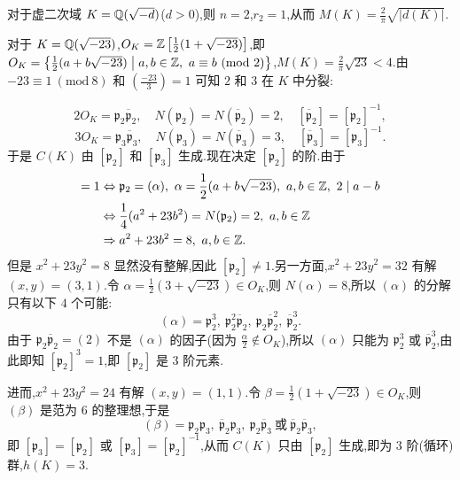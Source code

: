 \begin{example}\label{ex:ch3-s1-3-2}
对于虚二次域 $K=\mathbb{Q}(\sqrt{-d})$($d>0$),则 $n=2$,$r_2=1$,从而 $M(K)=\frac{2}{\pi}\sqrt{|d(K)|}$.

\begin{sloppypar}
对于 $K=\mathbb{Q}(\sqrt{-23})$,$O_K=\mathbb{Z}\left[\frac{1}{2}(1+\sqrt{-23})\right]$,即 $O_K=\left\{\frac{1}{2}(a+b\sqrt{-23})\;\middle|\;a,b\in\Z,\ a\equiv b\ (\mathrm{mod}\ 2)\right\}$,$M(K)=\frac{2}{\pi}\sqrt{23}<4$.由 $-23\equiv 1\ (\mathrm{mod}\ 8)$ 和 $\left(\frac{-23}{3}\right)=1$ 可知 $2$ 和 $3$ 在 $K$ 中分裂:
\end{sloppypar}
\[
  2O_K=\mathfrak{p}_2\overline{\mathfrak{p}}_2,\quad N(\mathfrak{p}_2)=N(\overline{\mathfrak{p}}_2)=2,\quad [\overline{\mathfrak{p}}_2]=[\mathfrak{p}_2]^{-1},
\]
\[
  3O_K=\mathfrak{p}_3\overline{\mathfrak{p}}_3,\quad N(\mathfrak{p}_3)=N(\overline{\mathfrak{p}}_3)=3,\quad [\overline{\mathfrak{p}}_3]=[\mathfrak{p}_3]^{-1}.
\]
于是 $C(K)$ 由 $[\mathfrak{p}_2]$ 和 $[\mathfrak{p}_3]$ 生成.现在决定 $[\mathfrak{p}_2]$ 的阶.由于
\begin{align*}
  [\mathfrak{p}_2]=1&\Leftrightarrow\mathfrak{p}_2=(\alpha),\ \alpha=\frac{1}{2}(a+b\sqrt{-23}),\ a,b\in\Z,\ 2\mid a-b\\
  &\Leftrightarrow\frac{1}{4}(a^2+23b^2)=N(\mathfrak{p}_2)=2,\ a,b\in\Z\\
  &\Rightarrow a^2+23b^2=8,\ a,b\in\Z.
\end{align*}
但是 $x^2+23y^2=8$ 显然没有整解,因此 $[\mathfrak{p}_2]\neq 1$.另一方面,$x^2+23y^2=32$ 有解 $(x,y)=(3,1)$.令 $\alpha=\frac{1}{2}(3+\sqrt{-23})\in O_K$,则 $N(\alpha)=8$,所以 $(\alpha)$ 的分解只有以下 $4$ 个可能:
\[
  (\alpha)=\mathfrak{p}_2^3,\ \mathfrak{p}_2^2\overline{\mathfrak{p}}_2,\ \mathfrak{p}_2\overline{\mathfrak{p}}_2^2,\ \overline{\mathfrak{p}}_2^3.
\]
由于 $\mathfrak{p}_2\overline{\mathfrak{p}}_2=(2)$ 不是 $(\alpha)$ 的因子(因为 $\frac{\alpha}{2}\notin O_K$),所以 $(\alpha)$ 只能为 $\mathfrak{p}_2^3$ 或 $\overline{\mathfrak{p}}_2^3$,由此即知 $[\mathfrak{p}_2]^3=1$,即 $[\mathfrak{p}_2]$ 是 $3$ 阶元素.

进而,$x^2+23y^2=24$ 有解 $(x,y)=(1,1)$.令 $\beta=\frac{1}{2}(1+\sqrt{-23})\in O_K$,则 $(\beta)$ 是范为 $6$ 的整理想,于是
\[
  (\beta)=\mathfrak{p}_2\mathfrak{p}_3,\ \overline{\mathfrak{p}}_2\mathfrak{p}_3,\ \mathfrak{p}_2\overline{\mathfrak{p}}_3\ \text{或}\ \overline{\mathfrak{p}}_2\overline{\mathfrak{p}}_3,
\]
即 $[\mathfrak{p}_3]=[\mathfrak{p}_2]$ 或 $[\mathfrak{p}_3]=[\mathfrak{p}_2]^{-1}$,从而 $C(K)$ 只由 $[\mathfrak{p}_2]$ 生成,即为 $3$ 阶(循环)群,$h(K)=3$.


\end{example}
